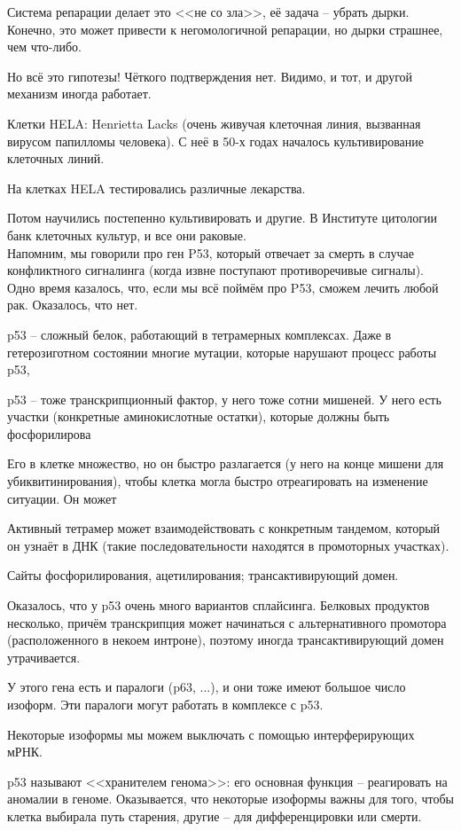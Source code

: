 \documentclass[main.tex]{subfiles}
\begin{document}
Система репарации делает это <<не со зла>>, её задача -- убрать дырки.
Конечно, это может привести к негомологичной репарации, но дырки страшнее, чем что-либо.

Но всё это гипотезы!
Чёткого подтверждения нет.
Видимо, и тот, и другой механизм иногда работает.

Клетки HELA: Henrietta Lacks (очень живучая клеточная линия, вызванная вирусом папилломы человека).
С неё в 50-х годах началось культивирование клеточных линий.

На клетках HELA тестировались различные лекарства.

Потом научились постепенно культивировать и другие.
В Институте цитологии банк клеточных культур, и все они раковые. \\

Напомним, мы говорили про ген P53, который отвечает за смерть в случае конфликтного сигналинга (когда извне поступают противоречивые сигналы).
Одно время казалось, что, если мы всё поймём про P53, сможем лечить любой рак.
Оказалось, что нет.

p53 -- сложный белок, работающий в тетрамерных комплексах.
Даже в гетерозиготном состоянии многие мутации, которые нарушают процесс работы p53,

p53 -- тоже транскрипционный фактор, у него тоже сотни мишеней.
У него есть участки (конкретные аминокислотные остатки), которые должны быть фосфорилирова

Его в клетке множество, но он быстро разлагается (у него на конце мишени для убиквитинирования), чтобы клетка могла быстро отреагировать на изменение ситуации.
Он может %

Активный тетрамер может взаимодействовать с конкретным тандемом, который он узнаёт в ДНК (такие последовательности находятся в промоторных участках).

Сайты фосфорилирования, ацетилирования; трансактивирующий домен. %

Оказалось, что у p53 очень много вариантов сплайсинга.
Белковых продуктов несколько, причём транскрипция может начинаться с альтернативного промотора (расположенного в некоем интроне), поэтому иногда трансактивирующий домен утрачивается.

У этого гена есть и паралоги (p63, ...), и они тоже имеют большое число изоформ.
Эти паралоги могут работать в комплексе с p53.

Некоторые изоформы мы можем выключать с помощью интерферирующих мРНК.

p53 называют <<хранителем генома>>: его основная функция -- реагировать на аномалии в геноме.
Оказывается, что некоторые изоформы важны для того, чтобы клетка выбирала путь старения, другие -- для дифференцировки или смерти.
\end{document}
